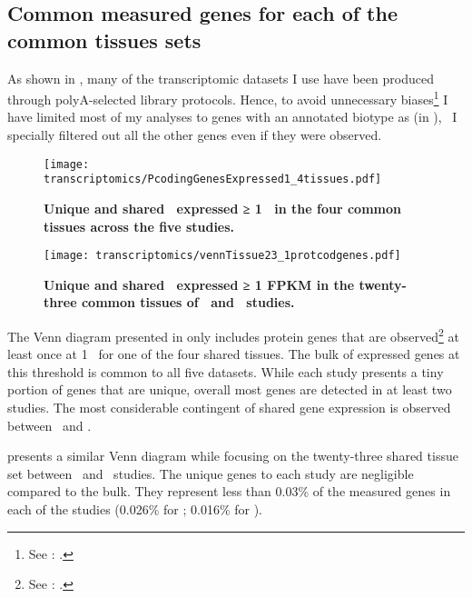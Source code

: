 \subsection{Common measured genes for each of the common tissues sets}%
\label{subsec:transGeneOverlap}
As shown in ,
many of the transcriptomic datasets I use have been produced through
polyA-selected library protocols.
Hence,
to avoid unnecessary biases\footnote{See
: .}
I have limited most of my analyses to genes with an annotated biotype as
\emph{\pc} (in ),
\ie\ I specially filtered out all the other genes even if they were observed.

\begin{figure}[!hptb]
    \texttt{[image: transcriptomics/PcodingGenesExpressed1\_4tissues.pdf]}\centering
    \caption[Unique and shared \pcgs\ expressed
    in the 4 common tissues (≥1 \FPKM)]{\label{fig:ExpGenePcoding1}\textbf{Unique
    and shared \pcgs\ expressed ≥ 1 \FPKM\ in the four common tissues
    across the five studies.}}
\end{figure}

\begin{figure}[!hptb]
    \texttt{[image: transcriptomics/vennTissue23\_1protcodgenes.pdf]}\centering
    \caption[Unique and shared \pcgs\ expressed
    in the 23 common tissues (≥1 \FPKM)]%
    {\label{fig:ExpGenePcoding1_t23}\textbf{Unique
    and shared \pcgs\ expressed ≥ 1 FPKM in the twenty-three common tissues
    of \uhlen\ and \gtex\ studies.}}
\end{figure}

The Venn diagram presented in  only includes protein
genes that are observed\footnote{See
: .}
at least once at 1 \FPKM\ for one of the four shared tissues.
The bulk of expressed genes at this threshold is common
to all five datasets.
While each study presents a tiny portion of genes
that are unique,
overall most genes are detected in at least two studies.
The most considerable contingent of shared gene expression is observed
between \uhlen\ and \gtex.

 presents a similar Venn diagram
while focusing on the twenty-three shared tissue set
between \uhlen\ and \gtex\ studies.
The unique genes to each study are negligible compared to the bulk.
They represent less than 0.03\% of the measured genes in each of the studies
(0.026\% for \uhlen; 0.016\% for \gtex).
\begin{comment}
    Gtex:   462/17551 hence 0.02632329\%
    Uhlen:  281/17551 hence 0.01601048\%
\end{comment}

